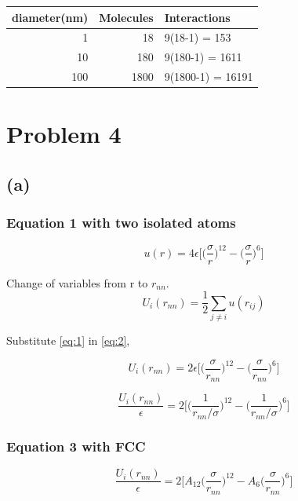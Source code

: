 \documentclass{article}
\begin{document}
\begin{center}
\begin{tabular}{rrl}
\hline
diameter(nm) & Molecules & Interactions\\
\hline
1 & 18 & 9(18-1) = 153\\
10 & 180 & 9(180-1) = 1611\\
100 & 1800 & 9(1800-1) = 16191\\
\hline
\end{tabular}
\end{center}

\section{Problem 4}
\label{sec-4}
\subsection{(a)}
\label{sec-4-1}

\subsubsection{Equation 1 with two isolated atoms}
\label{sec-4-1-1}
\begin{equation}
u(r) = 4\epsilon \Big[\Big(\frac{\sigma}{r}\Big)^{12} - \Big(\frac{\sigma}{r}\Big)^6\Big] \label{eq:1}
\end{equation}

Change of variables from r to $r_{nn}$.
\begin{equation}
U_{i}(r_{nn}) = \frac{1}{2} \sum_{j \neq i} u(r_{ij}) \label{eq:2}
\end{equation}

Substitute \eqref{eq:1} in \eqref{eq:2}, 

\begin{equation}
U_{i}(r_{nn}) = 2\epsilon \Big[\Big(\frac{\sigma}{r_{nn}}\Big)^{12} - \Big(\frac{\sigma}{r_{nn}}\Big)^6\Big] \label{eq:3}
\end{equation}

\begin{equation}
\boxed{\frac{U_{i}(r_{nn})}{\epsilon} = 2 \Big[\Big(\frac{1}{r_{nn}/\sigma}\Big)^{12} - \Big(\frac{1}{r_{nn}/\sigma}\Big)^6\Big] \label{eq:4}}
\end{equation}

\subsubsection{Equation 3 with FCC}
\label{sec-4-1-2}
\begin{equation}
\frac{U_{i}(r_{nn})}{\epsilon} = 2 \Big[A_{12}\Big(\frac{\sigma}{r_{nn}}\Big)^{12} - A_6\Big(\frac{\sigma}{r_{nn}}\Big)^6\Big] \label{eq:5}
\end{equation}
\end{document}
